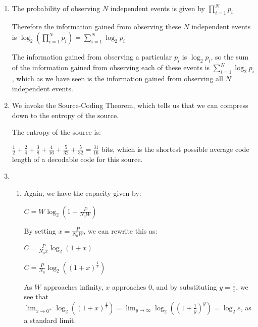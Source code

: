 


\begin{enumerate}[label=(\alph*)]
  \item
    The probability of observing $N$ independent events is given by $\prod_{i=1}^N p_i$

    Therefore the information gained from observing these $N$ independent events is $\log_2({\prod_{i=1}^N p_i}) = \sum_{i=1}^N \log_2 p_i$

    The information gained from observing a particular $p_i$ is $\log_2 p_i$, so the sum of the information gained from observing each of these events is $\sum_{i=1}^N \log_2 p_i$, which as we have seen is the information gained from observing all $N$ independent events.

  \item
    We invoke the Source-Coding Theorem, which tells us that we can compress down to the entropy of the source.

    The entropy of the source is:

    $\frac{1}{2} + \frac{2}{4} + \frac{3}{8} + \frac{4}{16} + \frac{5}{32} + \frac{5}{32} = \frac{31}{16}$ bits, which is the shortest possible average code length of a decodable code for this source.

  \item
    \begin{enumerate}[label=(\roman*)]

      The capacity is given by:

      $C = W\log_2(1 + \frac{P}{N_0W})$

      Through the Shannon Hartley Theorem.

      By increasing $\frac{P}{N_0W}$ we are always able to increase the value of the $\log$, and thus the capacity. There is no limit.

    \item

      Again, we have the capacity given by:

      $C = W\log_2(1 + \frac{P}{N_0W})$

      By setting $x = \frac{P}{N_0W}$, we can rewrite this as:

      $C = \frac{P}{N_0x}\log_2(1 + x)$

      $C = \frac{P}{N_0}\log_2((1 + x)^{\frac{1}{x}})$

      As $W$ approaches infinity, $x$ approaches 0, and by substituting $y = \frac{1}{x}$, we see that $\lim_{x \to 0^+} \log_2((1 + x)^{\frac{1}{x}}) = \lim_{y \to \infty} \log_2((1 + \frac{1}{y})^y) = \log_2 e$, as a standard limit.


\end{enumerate}
\end{enumerate}
